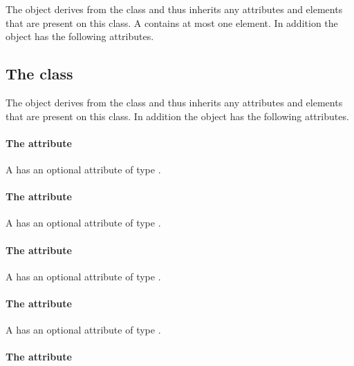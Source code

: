 
The \Polygon object derives from the  class
and thus inherits any attributes and elements that are present on this
class.
A \Polygon contains at most one  element.
In addition the \Polygon object has the following attributes.

\subsection{The  class}
\label{radialgradient-class}


The \RadialGradient object derives from the  class
and thus inherits any attributes and elements that are present on this
class.
In addition the \RadialGradient object has the following attributes.

\paragraph{The \fixttspace{} attribute}

A \RadialGradient has an optional attribute  of type
\RelAbsVector.

\paragraph{The \fixttspace{} attribute}

A \RadialGradient has an optional attribute  of type
\RelAbsVector.

\paragraph{The \fixttspace{} attribute}

A \RadialGradient has an optional attribute  of type
\RelAbsVector.

\paragraph{The \fixttspace{} attribute}

A \RadialGradient has an optional attribute  of type
\RelAbsVector.

\paragraph{The \fixttspace{} attribute}

